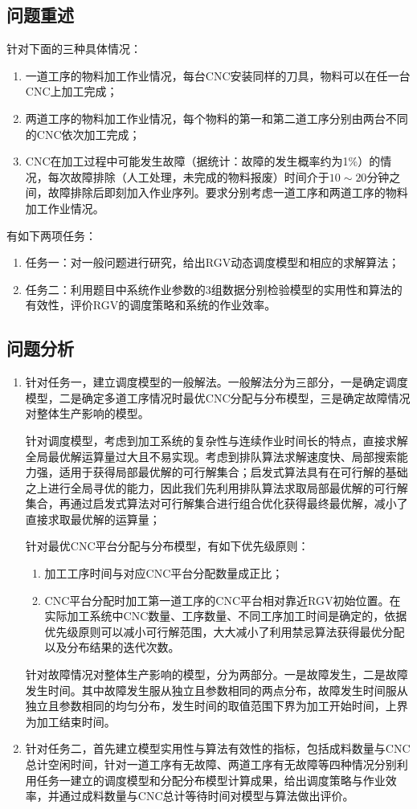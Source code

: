 	\subsection{问题重述}
		针对下面的三种具体情况：
		\begin{enumerate}
			\item 一道工序的物料加工作业情况，每台CNC安装同样的刀具，物料可以在任一台CNC上加工完成；
			\item 两道工序的物料加工作业情况，每个物料的第一和第二道工序分别由两台不同的CNC依次加工完成；
			\item CNC在加工过程中可能发生故障（据统计：故障的发生概率约为1\%）的情况，每次故障排除（人工处理，未完成的物料报废）时间介于\(10\sim20\)分钟之间，故障排除后即刻加入作业序列。要求分别考虑一道工序和两道工序的物料加工作业情况。
		\end{enumerate}
			有如下两项任务：
		\begin{enumerate}
			\item 任务一：对一般问题进行研究，给出RGV动态调度模型和相应的求解算法；
			\item 任务二：利用题目中系统作业参数的3组数据分别检验模型的实用性和算法的有效性，评价RGV的调度策略和系统的作业效率。
		\end{enumerate}
	\subsection{问题分析}
		\begin{enumerate}
			\item 针对任务一，建立调度模型的一般解法。一般解法分为三部分，一是确定调度模型，二是确定多道工序情况时最优CNC分配与分布模型，三是确定故障情况对整体生产影响的模型。
			\par\indent 针对调度模型，考虑到加工系统的复杂性与连续作业时间长的特点，直接求解全局最优解运算量过大且不易实现。考虑到排队算法求解速度快、局部搜索能力强，适用于获得局部最优解的可行解集合；启发式算法具有在可行解的基础之上进行全局寻优的能力，因此我们先利用排队算法求取局部最优解的可行解集合，再通过启发式算法对可行解集合进行组合优化获得最终最优解，减小了直接求取最优解的运算量；
			\par\indent 针对最优CNC平台分配与分布模型，有如下优先级原则：
				\begin{enumerate}
					\item 加工工序时间与对应CNC平台分配数量成正比；
					\item CNC平台分配时加工第一道工序的CNC平台相对靠近RGV初始位置。在实际加工系统中CNC数量、工序数量、不同工序加工时间是确定的，依据优先级原则可以减小可行解范围，大大减小了利用禁忌算法获得最优分配以及分布结果的迭代次数。
				\end{enumerate}
			\par\indent 针对故障情况对整体生产影响的模型，分为两部分。一是故障发生，二是故障发生时间。其中故障发生服从独立且参数相同的两点分布，故障发生时间服从独立且参数相同的均匀分布，发生时间的取值范围下界为加工开始时间，上界为加工结束时间。
			\item 针对任务二，首先建立模型实用性与算法有效性的指标，包括成料数量与CNC总计空闲时间，针对一道工序有无故障、两道工序有无故障等四种情况分别利用任务一建立的调度模型和分配分布模型计算成果，给出调度策略与作业效率，并通过成料数量与CNC总计等待时间对模型与算法做出评价。
		\end{enumerate}
